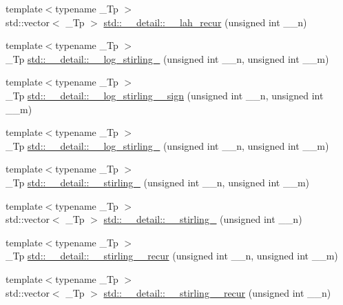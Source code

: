 \begin{DoxyCompactItemize}
\item 
{\footnotesize template$<$typename \+\_\+\+Tp $>$ }\\std\+::vector$<$ \+\_\+\+Tp $>$ \hyperlink{namespacestd_1_1____detail_a335ad35b2674153db0fe4da6d025afae}{std\+::\+\_\+\+\_\+detail\+::\+\_\+\+\_\+lah\+\_\+recur} (unsigned int \+\_\+\+\_\+n)
\item 
{\footnotesize template$<$typename \+\_\+\+Tp $>$ }\\\+\_\+\+Tp \hyperlink{namespacestd_1_1____detail_a4924c5c0666c33328d6276b5dbbdfad5}{std\+::\+\_\+\+\_\+detail\+::\+\_\+\+\_\+log\+\_\+stirling\+\_} (unsigned int \+\_\+\+\_\+n, unsigned int \+\_\+\+\_\+m)
\item 
{\footnotesize template$<$typename \+\_\+\+Tp $>$ }\\\+\_\+\+Tp \hyperlink{namespacestd_1_1____detail_af804ed0eecfca835d1338a48892460b0}{std\+::\+\_\+\+\_\+detail\+::\+\_\+\+\_\+log\+\_\+stirling\+\_\+\_\+sign} (unsigned int \+\_\+\+\_\+n, unsigned int \+\_\+\+\_\+m)
\item 
{\footnotesize template$<$typename \+\_\+\+Tp $>$ }\\\+\_\+\+Tp \hyperlink{namespacestd_1_1____detail_a7ba1fde0547236676d579b6405f2fb25}{std\+::\+\_\+\+\_\+detail\+::\+\_\+\+\_\+log\+\_\+stirling\+\_} (unsigned int \+\_\+\+\_\+n, unsigned int \+\_\+\+\_\+m)
\item 
{\footnotesize template$<$typename \+\_\+\+Tp $>$ }\\\+\_\+\+Tp \hyperlink{namespacestd_1_1____detail_a8b215e4ca28ec9b7b078d7f3d9aecc17}{std\+::\+\_\+\+\_\+detail\+::\+\_\+\+\_\+stirling\+\_} (unsigned int \+\_\+\+\_\+n, unsigned int \+\_\+\+\_\+m)
\item 
{\footnotesize template$<$typename \+\_\+\+Tp $>$ }\\std\+::vector$<$ \+\_\+\+Tp $>$ \hyperlink{namespacestd_1_1____detail_a8d1c581fb8fddd354f7f1cbbdbe6f2d2}{std\+::\+\_\+\+\_\+detail\+::\+\_\+\+\_\+stirling\+\_} (unsigned int \+\_\+\+\_\+n)
\item 
{\footnotesize template$<$typename \+\_\+\+Tp $>$ }\\\+\_\+\+Tp \hyperlink{namespacestd_1_1____detail_a0a47b5d34956a55f438f2ba079680acd}{std\+::\+\_\+\+\_\+detail\+::\+\_\+\+\_\+stirling\+\_\+\_\+recur} (unsigned int \+\_\+\+\_\+n, unsigned int \+\_\+\+\_\+m)
\item 
{\footnotesize template$<$typename \+\_\+\+Tp $>$ }\\std\+::vector$<$ \+\_\+\+Tp $>$ \hyperlink{namespacestd_1_1____detail_a2fe6ac62307cb1aded6ffae4dcc81f0b}{std\+::\+\_\+\+\_\+detail\+::\+\_\+\+\_\+stirling\+\_\+\_\+recur} (unsigned int \+\_\+\+\_\+n)

\end{DoxyCompactItemize}
